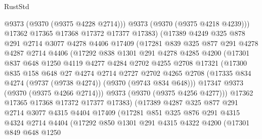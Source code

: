 \begin{lexlean}{RustStd}
\begin{coremodule}
                  @9373
                  (@9370 (@9375 @4228 @2714)))
                @9373
                (@9370 (@9375 @4218 @4239)))
              @17362
              @17365
              @17368
              @17372
              @17377
              @17383)
            (@17389
              @4249
              @325
              @878
              @291
              @2714
              @3077
              @4278
              @4406
              @17409
              (@17281
                @839
                @325
                @877
                @291
                @4278
                @4287
                @2714
                @4406
                (@17292
                  @838
                  @1301
                  @291
                  @4278
                  @4285
                  @4200
                  (@17301
                    @837
                    @648
                    @1250
                    @4119
                    @4277
                    @4284
                    @2702
                    @4255
                    @2708
                    @17321
                    (@17300
                      @835
                      @158
                      @648
                      @27
                      @4274
                      @2714
                      @2727
                      @2702
                      @4265
                      @2708
                      (@17335 @834 @4274 (@9737 (@9738 @4274)) (@9370 (@9743 @834 @648)))
                      @17347
                      @9373
                      (@9370 (@9375 @4266 @2714)))
                    @9373
                    (@9370 (@9375 @4256 @4277)))
                  @17362
                  @17365
                  @17368
                  @17372
                  @17377
                  @17383)
                (@17389
                  @4287
                  @325
                  @877
                  @291
                  @2714
                  @3077
                  @4315
                  @4404
                  @17409
                  (@17281
                    @851
                    @325
                    @876
                    @291
                    @4315
                    @4324
                    @2714
                    @4404
                    (@17292
                      @850
                      @1301
                      @291
                      @4315
                      @4322
                      @4200
                      (@17301
                        @849
                        @648
                        @1250

\end{coremodule}
\end{lexlean}
